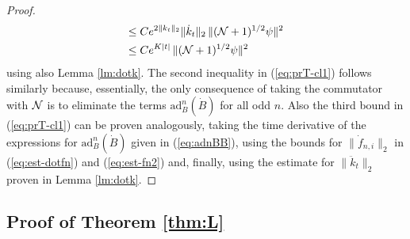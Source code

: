 \documentclass[11pt,a4paper]{article}
\newcommand{\ech}[2]{#2}	%
\newcommand{\ekt}{e^{K\lvert t\rvert}}	%
\newcommand{\cN}{{\cal N}}
\begin{document}
\begin{proof}
\[\begin{split}
\leq \; & C e^{2\| k_t \|_2} \| \dot{k}_t \|_2 \, \| (\cN+1)^{1/2} \psi \|^2 \\
\leq \; & C \ech{\| \varphi_t^{(N)} \|_{H^2}}{\ekt} \, \| (\cN+1)^{1/2} \psi \|^2 
\end{split}
\]
using also Lemma \ref{lm:dotk}. The second inequality in (\ref{eq:prT-cl1}) follows similarly because, essentially, the only consequence of taking the commutator with $\cN$ is to eliminate the terms $\text{ad}^n_B (\dot{B})$ for all odd $n$. Also the third bound in (\ref{eq:prT-cl1}) can be proven analogously, taking the time derivative of the expressions for $\text{ad}^n_B (\dot{B})$ given in (\ref{eq:adnBB}), using the bounds for $\| \dot f_{n,i} \|_2$ in (\ref{eq:est-dotfn}) and (\ref{eq:est-fn2}) and, finally, using the estimate for $\| \ddot k_t \|_2$ proven in Lemma \ref{lm:dotk}.
\end{proof}

\subsection{Proof of Theorem \ref{thm:L}}
\end{document}
